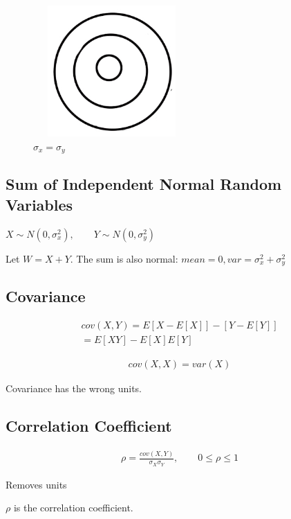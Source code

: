 \begin{figure}[ht]
\centering
\includegraphics[width=6cm, height=5cm]{images/L11/percent_circle.jpeg}
\caption{$\sigma_x = \sigma_y$}
\end{figure}

\subsection{Sum of Independent Normal Random Variables}


$X \sim N(0, \sigma_x^2), \qquad Y \sim N(0, \sigma_y^2)$

Let $W=X+Y$.  The sum is also normal: $mean=0,var=\sigma_x^2 + \sigma_y^2$

\subsection{Covariance}


\begin{align}
    cov(X,Y)=E[X-E[X]] - [Y - E[Y]] \\
    = E[XY] - E[X]E[Y]
\end{align}

\begin{align*}
cov(X,X)=var(X)
\end{align*}

Covariance has the wrong units.

\subsection{Correlation Coefficient}


\begin{align}
\rho = \frac{cov(X,Y)}{\sigma_X \sigma_Y}, \qquad 0 \le \rho \le 1
\end{align}

Removes units

$\rho$ is the correlation coefficient.
